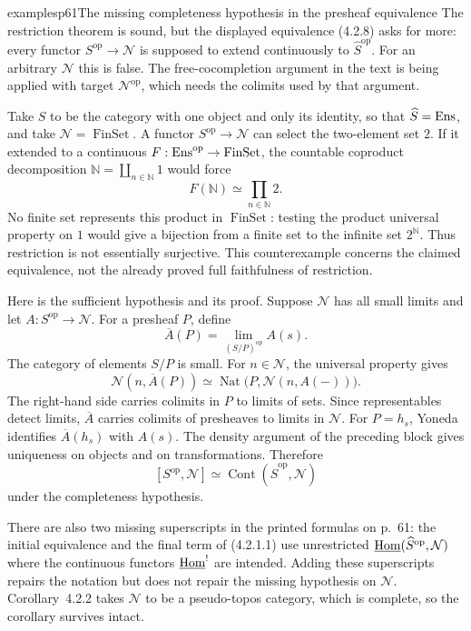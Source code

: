 \begin{dcomment}{examples}{p61}{The missing completeness hypothesis in the presheaf equivalence}
The restriction theorem is sound, but the displayed equivalence (4.2.8) asks for more: every functor $S^{\mathrm{op}}\to\mathcal N$ is supposed to extend continuously to $\widehat S^{\mathrm{op}}$. For an arbitrary $\mathcal N$ this is false. The free-cocompletion argument in the text is being applied with target $\mathcal N^{\mathrm{op}}$, which needs the colimits used by that argument.

Take $S$ to be the category with one object and only its identity, so that $\widehat S=\mathrm{Ens}$, and take $\mathcal N=\operatorname{FinSet}$. A functor $S^{\mathrm{op}}\to\mathcal N$ can select the two-element set $2$. If it extended to a continuous $F:\mathrm{Ens}^{\mathrm{op}}\to\operatorname{FinSet}$, the countable coproduct decomposition $\mathbb N=\coprod_{n\in\mathbb N}1$ would force
\[
 F(\mathbb N)\simeq\prod_{n\in\mathbb N}2.
\]
No finite set represents this product in $\operatorname{FinSet}$: testing the product universal property on $1$ would give a bijection from a finite set to the infinite set $2^{\mathbb N}$. Thus restriction is not essentially surjective. This counterexample concerns the claimed equivalence, not the already proved full faithfulness of restriction.

Here is the sufficient hypothesis and its proof. Suppose $\mathcal N$ has all small limits and let $A:S^{\mathrm{op}}\to\mathcal N$. For a presheaf $P$, define
\[
 \overline A(P)=\lim_{(S/P)^{\mathrm{op}}}A(s).
\]
The category of elements $S/P$ is small. For $n\in\mathcal N$, the universal property gives
\[
 \mathcal N(n,\overline A(P))
 \simeq\operatorname{Nat}\bigl(P,\mathcal N(n,A(-))\bigr).
\]
The right-hand side carries colimits in $P$ to limits of sets. Since representables detect limits, $\overline A$ carries colimits of presheaves to limits in $\mathcal N$. For $P=h_s$, Yoneda identifies $\overline A(h_s)$ with $A(s)$. The density argument of the preceding block gives uniqueness on objects and on transformations. Therefore
\[
 [S^{\mathrm{op}},\mathcal N]\simeq
 \operatorname{Cont}(\widehat S^{\mathrm{op}},\mathcal N)
\]
under the completeness hypothesis.

There are also two missing superscripts in the printed formulas on p.~61: the initial equivalence and the final term of (4.2.1.1) use unrestricted $\underline{\mathrm{Hom}}(\widehat S^{\mathrm{op}},\mathcal N)$ where the continuous functors $\underline{\mathrm{Hom}}^{!}$ are intended. Adding these superscripts repairs the notation but does not repair the missing hypothesis on $\mathcal N$. Corollary~4.2.2 takes $\mathcal N$ to be a pseudo-topos category, which is complete, so the corollary survives intact.
\end{dcomment}


